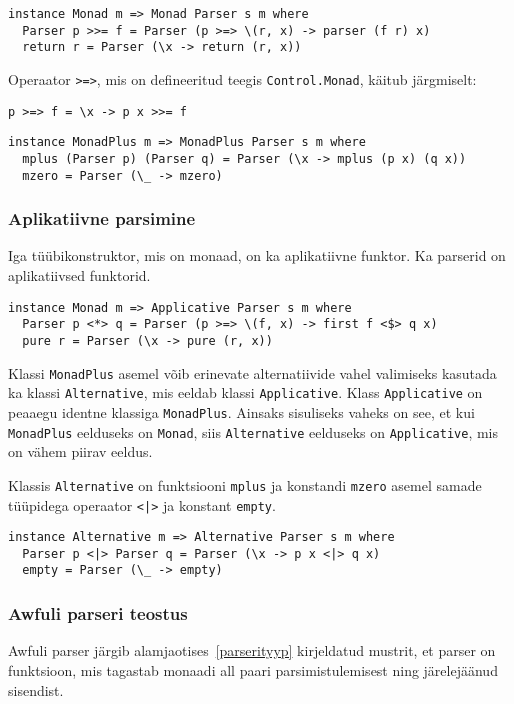 \documentclass[12pt]{article}
\begin{document}
        \begin{verbatim}instance Monad m => Monad Parser s m where
  Parser p >>= f = Parser (p >=> \(r, x) -> parser (f r) x)
  return r = Parser (\x -> return (r, x))\end{verbatim}

        Operaator \verb!>=>!, mis on defineeritud teegis \verb!Control.Monad!, käitub järgmiselt:

        \begin{verbatim}p >=> f = \x -> p x >>= f\end{verbatim}

        \begin{verbatim}instance MonadPlus m => MonadPlus Parser s m where
  mplus (Parser p) (Parser q) = Parser (\x -> mplus (p x) (q x))
  mzero = Parser (\_ -> mzero)\end{verbatim}
      \subsubsection{Aplikatiivne parsimine}\label{appars}
        Iga tüübikonstruktor, mis on monaad, on ka aplikatiivne funktor. Ka parserid on aplikatiivsed funktorid.

        \begin{verbatim}instance Monad m => Applicative Parser s m where
  Parser p <*> q = Parser (p >=> \(f, x) -> first f <$> q x)
  pure r = Parser (\x -> pure (r, x))\end{verbatim}

        Klassi \verb!MonadPlus! asemel võib erinevate alternatiivide vahel valimiseks kasutada ka klassi \verb!Alternative!, mis eeldab klassi \verb!Applicative!. Klass \verb!Applicative! on peaaegu identne klassiga \verb!MonadPlus!. Ainsaks sisuliseks vaheks on see, et kui \verb!MonadPlus! eelduseks on \verb!Monad!, siis \verb!Alternative! eelduseks on \verb!Applicative!, mis on vähem piirav eeldus.

        Klassis \verb!Alternative! on funktsiooni \verb!mplus! ja konstandi \verb!mzero! asemel samade tüüpidega operaator \verb!<|>! ja konstant \verb!empty!.

        \begin{verbatim}instance Alternative m => Alternative Parser s m where
  Parser p <|> Parser q = Parser (\x -> p x <|> q x)
  empty = Parser (\_ -> empty)\end{verbatim}
      \subsubsection{Awfuli parseri teostus}
        Awfuli parser järgib alamjaotises~\ref{parserityyp} kirjeldatud mustrit, et parser on funktsioon, mis tagastab monaadi all paari parsimistulemisest ning järelejäänud sisendist.
\end{document}
